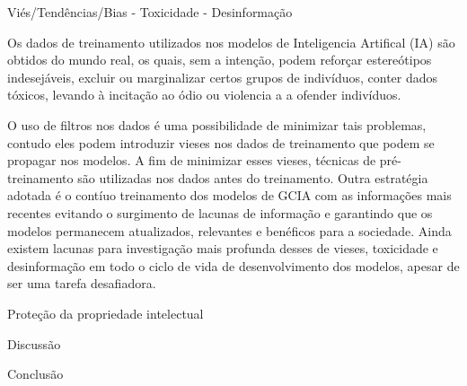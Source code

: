 Viés/Tendências/Bias - Toxicidade - Desinformação

Os dados de treinamento utilizados nos modelos de Inteligencia Artifical (IA) são obtidos do mundo real, os quais, sem a intenção, podem reforçar estereótipos indesejáveis, excluir ou marginalizar certos grupos de indivíduos, conter dados tóxicos, levando à incitação ao ódio ou violencia a a ofender indivíduos. 

O uso de filtros nos dados é uma possibilidade de minimizar tais problemas, contudo eles podem introduzir vieses nos dados de treinamento que podem se propagar nos modelos. A fim de minimizar esses vieses, técnicas de pré-treinamento são utilizadas nos dados antes do treinamento. Outra estratégia adotada é o contíuo treinamento dos modelos de GCIA com as informações mais recentes evitando o surgimento de lacunas de informação e garantindo que os modelos permanecem atualizados, relevantes e benéficos para a sociedade. Ainda existem lacunas para investigação mais profunda desses de vieses, toxicidade e desinformação em todo o ciclo de vida de desenvolvimento dos modelos, apesar de ser uma tarefa desafiadora.


Proteção da propriedade intelectual




Discussão 

Conclusão 

